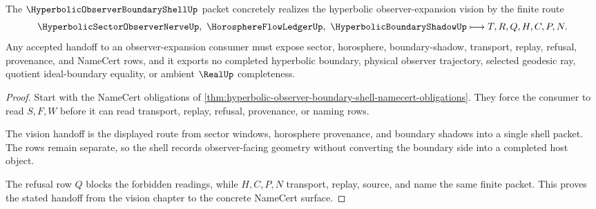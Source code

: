 \begin{theorem}
\label{thm:hyperbolic-observer-boundary-shell-vision-handoff}
The $\HyperbolicObserverBoundaryShellUp$ packet concretely realizes the hyperbolic observer-expansion vision by the finite route
$$
\HyperbolicSectorObserverNerveUp,\ \HorosphereFlowLedgerUp,\ \HyperbolicBoundaryShadowUp \longmapsto T,R,Q,H,C,P,N .
$$
Any accepted handoff to an observer-expansion consumer must expose sector, horosphere, boundary-shadow, transport, replay, refusal, provenance, and NameCert rows, and it exports no completed hyperbolic boundary, physical observer trajectory, selected geodesic ray, quotient ideal-boundary equality, or ambient $\RealUp$ completeness.
\end{theorem}
\begin{proof}
Start with the NameCert obligations of \autoref{thm:hyperbolic-observer-boundary-shell-namecert-obligations}. They force the consumer to read $S,F,W$ before it can read transport, replay, refusal, provenance, or naming rows.

The vision handoff is the displayed route from sector windows, horosphere provenance, and boundary shadows into a single shell packet. The rows remain separate, so the shell records observer-facing geometry without converting the boundary side into a completed host object.

The refusal row $Q$ blocks the forbidden readings, while $H,C,P,N$ transport, replay, source, and name the same finite packet. This proves the stated handoff from the vision chapter to the concrete NameCert surface.
\end{proof}




